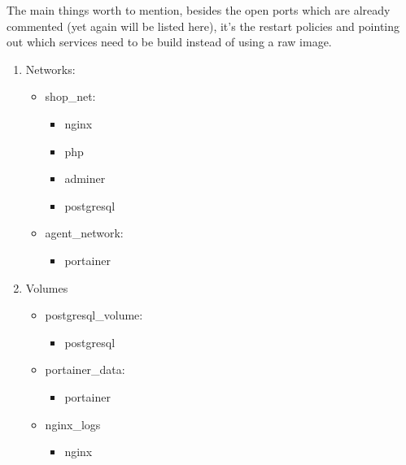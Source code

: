     \newpage
    \begin{flushleft}
        The main things worth to mention, besides the open ports which are already commented (yet again will be listed here),
        it's the restart policies and pointing out which services need to be build instead of using a raw image.
    \end{flushleft}
    \begin{enumerate}
        \item Networks:
            \begin{itemize}
                \item shop\_net:
                \begin{itemize}
                    \item nginx
                    \item php
                    \item adminer
                    \item postgresql
                \end{itemize}
                \item agent\_network:
                \begin{itemize}
                    \item portainer
                \end{itemize}
            \end{itemize}
        \item Volumes
            \begin{itemize}
                \item postgresql\_volume:
                \begin{itemize}
                      \item postgresql
                \end{itemize}
                \item portainer\_data:
                \begin{itemize}
                      \item portainer
                \end{itemize}
                \item nginx\_logs
                \begin{itemize}
                    \item nginx
                \end{itemize}
            \end{itemize}

    \end{enumerate}

